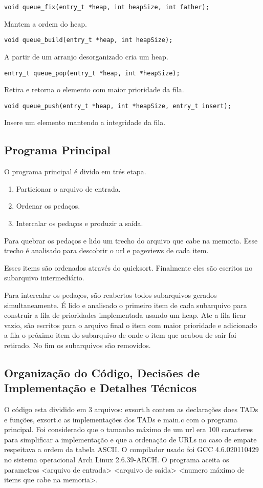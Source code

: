\documentclass[a4paper, 11pt]{article}
\begin{document}
\begin{verbatim}
void queue_fix(entry_t *heap, int heapSize, int father);
\end{verbatim}
Mantem a ordem do heap.

\begin{verbatim}
void queue_build(entry_t *heap, int heapSize);
\end{verbatim}
A partir de um arranjo desorganizado cria um heap.

\begin{verbatim}
entry_t queue_pop(entry_t *heap, int *heapSize);
\end{verbatim}
Retira e retorna o elemento com maior prioridade da fila.

\begin{verbatim}
void queue_push(entry_t *heap, int *heapSize, entry_t insert);
\end{verbatim}
Insere um elemento mantendo a integridade da fila.

\subsection{Programa Principal}
O programa principal é divido em trés etapa. 
\begin{enumerate}
\item Particionar o arquivo de entrada.
\item Ordenar os pedaços.
\item Intercalar os pedaços e produzir a saída. 
\end{enumerate}

Para quebrar os pedaços e lido um trecho do arquivo que cabe na memoria. Esse trecho é analisado para descobrir o url e pageviews de cada item. 

Esses items são ordenados através do quicksort. Finalmente eles são escritos no subarquivo intermediário.

Para intercalar os pedaços, são reabertos todos subarquivos gerados simultaneamente. É lido e analisado o primeiro item de cada subarquivo para construir a fila de prioridades implementada usando um heap. Ate a fila ficar vazio, são escritos para o arquivo final o item com maior prioridade e adicionado a fila o próximo item do subarquivo de onde o item que acabou de sair foi retirado. No fim os subarquivos são removidos.

\subsection{Organização do Código, Decisões de Implementação e Detalhes Técnicos}
O código esta dividido em 3 arquivos: exsort.h contem as declarações does TADs e funções, exsort.c as implementações dos TADs e main.c com o programa principal.
Foi considerado que o tamanho máximo de um url era 100 caracteres para simplificar a implementação e que a ordenação de URLs no caso de empate respeitava a ordem da tabela ASCII. O compilador usado foi GCC 4.6.020110429 no sistema operacional Arch Linux 2.6.39-ARCH. O programa aceita os parametros <arquivo de entrada> <arquivo de saída> <numero máximo de items que cabe na memoria>.
\end{document}
